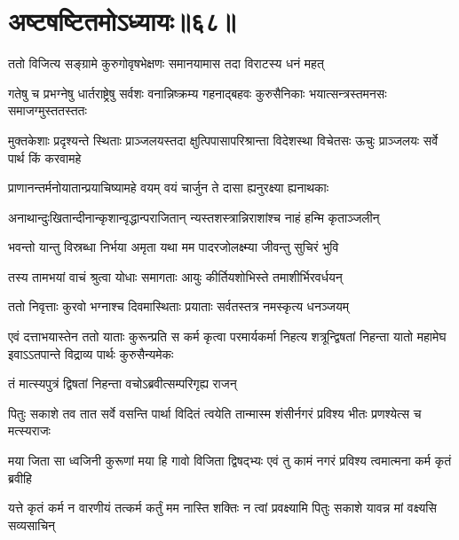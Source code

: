\chapter{अष्टषष्टितमोऽध्यायः॥६८॥}

\twolineshloka
{ततो विजित्य सङ्ग्रामे कुरुगोवृषभेक्षणः}
{समानयामास तदा विराटस्य धनं महत्}


\threelineshloka
{गतेषु च प्रभग्नेषु धार्तराष्ट्रेषु सर्वशः}
{वनान्निष्क्रम्य गहनाद्बहवः कुरुसैनिकाः}
{भयात्सन्त्रस्तमनसः समाजग्मुस्ततस्ततः}


\threelineshloka
{मुक्तकेशाः प्रदृश्यन्ते स्थिताः प्राञ्जलयस्तदा}
{क्षुत्पिपासापरिश्रान्ता विदेशस्था विचेतसः}
{ऊचुः प्राञ्जलयः सर्वे पार्थ किं करवामहे}


\twolineshloka
{प्राणानन्तर्मनोयातान्प्रयाचिष्यामहे वयम्}
{वयं चार्जुन ते दासा ह्यनुरक्ष्या ह्यनाथकाः}




\twolineshloka
{अनाथान्दुःखितान्दीनान्कृशान्वृद्धान्पराजितान्}
{न्यस्तशस्त्रान्निराशांश्च नाहं हन्मि कृताञ्जलीन्}


\twolineshloka
{भवन्तो यान्तु विस्रब्धा निर्भया अमृता यथा}
{मम पादरजोलक्ष्म्या जीवन्तु सुचिरं भुवि}


\twolineshloka
{तस्य तामभयां वाचं श्रुत्वा योधाः समागताः}
{आयुः कीर्तियशोभिस्ते तमाशीर्भिरवर्धयन्}


\twolineshloka
{ततो निवृत्ताः कुरवो भग्नाश्च दिवमास्थिताः}
{प्रयाताः सर्वतस्तत्र नमस्कृत्य धनञ्जयम्}


\onelineshloka
{एवं दत्ताभयास्तेन ततो याताः कुरून्प्रति}
\fourlineindentedshloka
{स कर्म कृत्वा परमार्यकर्मा}
{निहत्य शत्रून्द्विषतां निहन्ता}
{यातो महामेघ इवाऽऽतपान्ते}
{विद्राव्य पार्थः कुरुसैन्यमेकः}


\onelineindentedshloka
{तं मात्स्यपुत्रं द्विषतां निहन्ता}
{वचोऽब्रवीत्सम्परिगृह्य राजन्}


\fourlineindentedshloka
{पितुः सकाशे तव तात सर्वे}
{वसन्ति पार्था विदितं त्वयेति}
{तान्मास्म शंसीर्नगरं प्रविश्य}
{भीतः प्रणश्येत्स च मत्स्यराजः}


\fourlineindentedshloka
{मया जिता सा ध्वजिनी कुरूणां}
{मया हि गावो विजिता द्विषद्भ्यः}
{एवं तु कामं नगरं प्रविश्य}
{त्वमात्मना कर्म कृतं ब्रवीहि}




\fourlineindentedshloka
{यत्ते कृतं कर्म न वारणीयं}
{तत्कर्म कर्तुं मम नास्ति शक्तिः}
{न त्वां प्रवक्ष्यामि पितुः सकाशे}
{यावन्न मां वक्ष्यसि सव्यसाचिन्}

